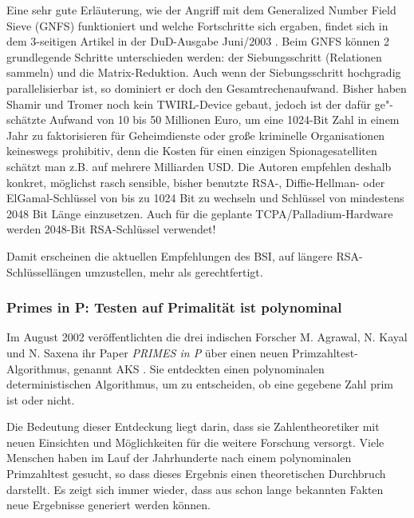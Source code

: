 \begin{refsegment}
Eine sehr gute Erläuterung, wie der Angriff mit dem Generalized Number Field
Sieve (GNFS)  funktioniert und
welche Fortschritte sich ergaben, findet sich
in dem 3-seitigen Artikel in der DuD-Ausgabe Juni/2003 \cite{Weis2003}.
Beim GNFS können 2 grundlegende Schritte unterschieden werden:
der Siebungsschritt (Relationen sammeln) und die Matrix-Reduktion.
Auch wenn der Siebungsschritt hochgradig parallelisierbar ist, so dominiert
er doch den Gesamtrechenaufwand. Bisher haben Shamir und Tromer noch kein
TWIRL-Device gebaut, jedoch ist der dafür ge"-schätzte Aufwand von 10 bis
50 Millionen Euro, um eine 1024-Bit Zahl in einem Jahr zu faktorisieren
für Geheimdienste oder große kriminelle Organisationen keineswegs prohibitiv,
denn die \glqq Kosten für einen einzigen Spionagesatelliten schätzt man
z.B. auf mehrere Milliarden USD\grqq. Die Autoren empfehlen deshalb konkret,
möglichst rasch sensible, bisher benutzte RSA-, Diffie-Hellman- oder
ElGamal-Schlüssel von bis zu 1024 Bit zu wechseln und Schlüssel von
mindestens 2048 Bit Länge einzusetzen.
Auch für die geplante TCPA/Palladium-Hardware  werden
2048-Bit RSA-Schlüssel verwendet!

Damit erscheinen die aktuellen Empfehlungen des BSI, auf längere
RSA-Schlüssellängen umzustellen, mehr als gerechtfertigt.



\subsubsection{\glqq Primes in P\grqq: Testen auf Primalität ist polynominal}
\label{PrimesinP} 

Im August 2002 veröffentlichten die drei indischen Forscher M. Agrawal,
N. Kayal und N. Saxena ihr Paper {\em \glqq PRIMES in P\grqq}  %
über einen neuen Primzahltest-Algorithmus, genannt AKS \cite{Agrawal2002}.
Sie entdeckten einen polynominalen deterministischen Algorithmus, um zu entscheiden, ob eine gegebene Zahl prim ist oder nicht.

Die Bedeutung dieser Entdeckung liegt darin, dass sie Zahlentheoretiker mit neuen Einsichten und Möglichkeiten für die weitere Forschung versorgt. Viele Menschen haben im Lauf der Jahrhunderte nach einem polynominalen Primzahltest gesucht, so dass dieses Ergebnis einen theoretischen Durchbruch darstellt. Es zeigt sich immer wieder, dass aus schon lange bekannten Fakten neue Ergebnisse generiert werden können.


\end{refsegment}
